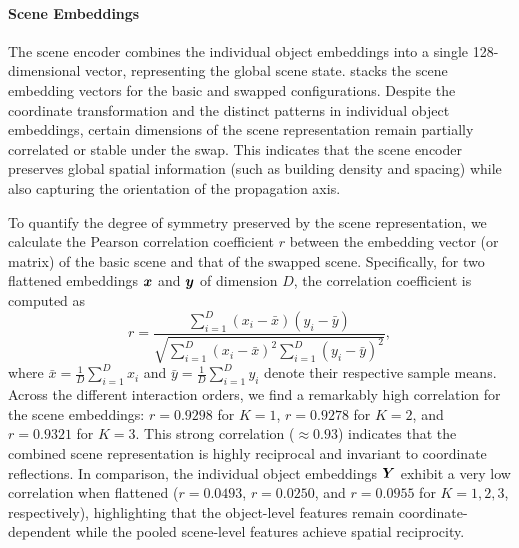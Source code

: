 \paragraph{Scene Embeddings} The scene encoder combines the individual object embeddings into a single 128-dimensional vector, representing the global scene state.  stacks the scene embedding vectors for the basic and swapped configurations. Despite the coordinate transformation and the distinct patterns in individual object embeddings, certain dimensions of the scene representation remain partially correlated or stable under the swap. This indicates that the scene encoder preserves global spatial information (such as building density and spacing) while also capturing the orientation of the propagation axis.

To quantify the degree of symmetry preserved by the scene representation, we calculate the Pearson correlation coefficient $r$ between the embedding vector (or matrix) of the basic scene and that of the swapped scene. Specifically, for two flattened embeddings $\boldsymbol{x}$ and $\boldsymbol{y}$ of dimension $D$, the correlation coefficient is computed as
\begin{equation}
  r = \frac{\sum\limits_{i=1}^{D} (x_i - \bar{x})(y_i - \bar{y})}{\sqrt{\sum\limits_{i=1}^{D} (x_i - \bar{x})^2 \sum\limits_{i=1}^{D} (y_i - \bar{y})^2}},
\end{equation}
where $\bar{x} = \tfrac{1}{D}\sum_{i=1}^D x_i$ and $\bar{y} = \tfrac{1}{D}\sum_{i=1}^D y_i$ denote their respective sample means. Across the different interaction orders, we find a remarkably high correlation for the scene embeddings: $r = 0.9298$ for $K=1$, $r = 0.9278$ for $K=2$, and $r = 0.9321$ for $K=3$. This strong correlation ($\approx 0.93$) indicates that the combined scene representation is highly reciprocal and invariant to coordinate reflections. In comparison, the individual object embeddings $\boldsymbol{Y}$ exhibit a very low correlation when flattened ($r = 0.0493$, $r = 0.0250$, and $r = 0.0955$ for $K=1, 2, 3$, respectively), highlighting that the object-level features remain coordinate-dependent while the pooled scene-level features achieve spatial reciprocity.

